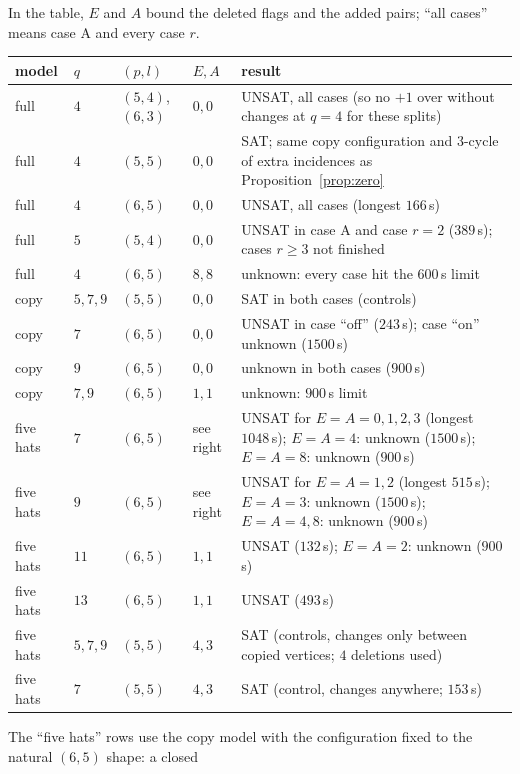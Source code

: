 In the table, $E$ and $A$ bound the deleted flags and the added pairs; ``all cases'' means case A and every case $r$.
\begin{center}
\small
\begin{tabular}{@{}llllp{5.5cm}@{}}
\toprule
model & $q$ & $(p,l)$ & $E, A$ & result\\
\midrule
full & $4$ & $(5,4)$, $(6,3)$ & $0, 0$ & UNSAT, all cases (so no $+1$ over \cite{AL} without changes at $q=4$ for these splits)\\
full & $4$ & $(5,5)$ & $0, 0$ & SAT; same copy configuration and $3$-cycle of extra incidences as Proposition~\ref{prop:zero}\\
full & $4$ & $(6,5)$ & $0, 0$ & UNSAT, all cases (longest $166$\,s)\\
full & $5$ & $(5,4)$ & $0, 0$ & UNSAT in case A and case $r=2$ ($389$\,s); cases $r \ge 3$ not finished\\
full & $4$ & $(6,5)$ & $8, 8$ & unknown: every case hit the $600$\,s limit\\
copy & $5,7,9$ & $(5,5)$ & $0, 0$ & SAT in both cases (controls)\\
copy & $7$ & $(6,5)$ & $0, 0$ & UNSAT in case ``off'' ($243$\,s); case ``on'' unknown ($1500$\,s)
\\
copy & $9$ & $(6,5)$ & $0, 0$ & unknown in both cases ($900$\,s)\\
copy & $7, 9$ & $(6,5)$ & $1, 1$ & unknown: $900$\,s limit\\
five hats & $7$ & $(6,5)$ & see right & UNSAT for $E = A = 0, 1, 2, 3$ (longest $1048$\,s); $E = A = 4$: unknown ($1500$\,s); $E = A = 8$: unknown ($900$\,s)
\\
five hats & $9$ & $(6,5)$ & see right & UNSAT for $E = A = 1, 2$ (longest $515$\,s); $E = A = 3$: unknown ($1500$\,s); $E = A = 4, 8$: unknown ($900$\,s)
\\
five hats & $11$ & $(6,5)$ & $1, 1$ & UNSAT ($132$\,s); $E = A = 2$: unknown ($900$\,s)
\\
five hats & $13$ & $(6,5)$ & $1, 1$ & UNSAT ($493$\,s)\\
five hats & $5,7,9$ & $(5,5)$ & $4, 3$ & SAT (controls, changes only between copied vertices; $4$ deletions used)\\
five hats & $7$ & $(5,5)$ & $4, 3$ & SAT (control, changes anywhere; $153$\,s)\\
\bottomrule
\end{tabular}
\end{center}
The ``five hats'' rows use the copy model with the configuration fixed to the natural $(6,5)$ shape: a closed
